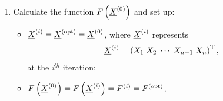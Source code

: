 \begin{enumerate}[{\bf Step 1: }]
   \item\label{Step3} Calculate the function $F\left(\mfr[\underline{X}]{}{0}\right)$ and set up:
       \begin{itemize}
           \item $\mfr[\underline{X}]{}{i} = \mfr[\underline{X}]{}{\text{opt}} = \mfr[\underline{X}]{}{0}$, where $\mfr[\underline{X}]{}{i}$ represents
                 \begin{displaymath}
                    \mfr[\underline{X}]{}{i} = \left(X_{1}\; X_{2}\; \cdots \; X_{n-1}\;  X_{n}\right)^{\text{T}},
                 \end{displaymath}
            at the {\it i}$^{th}$ iteration;
           \item $F\left(\mfr[\underline{X}]{}{0}\right) = F\left(\mfr[\underline{X}]{}{i}\right) = \mfr[F]{}{i} = \mfr[F]{}{\text{opt}}$. 
       \end{itemize}


\end{enumerate}
